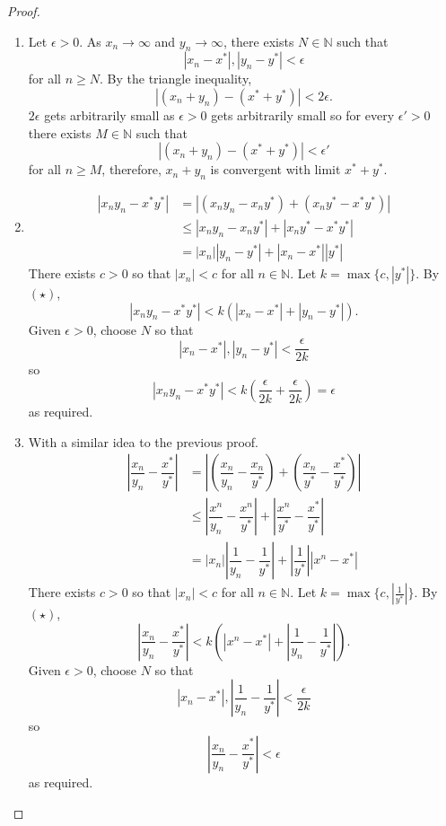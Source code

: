 \begin{proof}
    \begin{enumerate}
        \item Let $\epsilon>0$. As $x_n\to\infty$ and $y_n\to\infty$, there exists $N\in\mathbb N$ such that \[|x_n-x^*|,|y_n-y^*|<\epsilon\] for all $n\geq N$. By the triangle inequality, \[|(x_n+y_n)-(x^*+y^*)|<2\epsilon.\] $2\epsilon$ gets arbitrarily small as $\epsilon>0$ gets arbitrarily small so for every $\epsilon'>0$ there exists $M\in\mathbb N$ such that \[|(x_n+y_n)-(x^*+y^*)|<\epsilon'\] for all $n\geq M$, therefore, $x_n+y_n$ is convergent with limit $x^*+y^*$.
        
        \item 
        \begin{align*}
            |x_ny_n-x^*y^*|&=|(x_ny_n-x_ny^*)+(x_ny^*-x^*y^*)|\\
            &\leq|x_ny_n-x_ny^*|+|x_ny^*-x^*y^*|\\
            &=|x_n||y_n-y^*|+|x_n-x^*||y^*|\tag{$\star$}
        \end{align*}
        There exists $c>0$ so that $|x_n|<c$ for all $n\in\mathbb N$. Let $k=\max\{c,|y^*|\}$. By $(\star)$, \[|x_ny_n-x^*y^*|<k(|x_n-x^*|+|y_n-y^*|).\] Given $\epsilon>0$, choose $N$ so that \[|x_n-x^*|,|y_n-y^*|<\dfrac{\epsilon}{2k}\] so \[|x_ny_n-x^*y^*|<k\left(\dfrac{\epsilon}{2k}+\dfrac{\epsilon}{2k}\right)=\epsilon\] as required.

        \item With a similar idea to the previous proof.
        \begin{align*}
            \left|\dfrac{x_n}{y_n}-\dfrac{x^*}{y^*}\right|&=\left|\left(\dfrac{x_n}{y_n}-\dfrac{x_n}{y^*}\right)+\left(\dfrac{x_n}{y^*}-\dfrac{x^*}{y^*}\right)\right|\\
            &\leq\left|\dfrac{x^n}{y_n}-\dfrac{x^n}{y^*}\right|+\left|\dfrac{x^n}{y^*}-\dfrac{x^*}{y^*}\right|\\
            &=|x_n|\left|\dfrac{1}{y_n}-\dfrac{1}{y^*}\right|+\left|\dfrac1{y^*}\right|\left|x^n-x^*\right|\tag{$\star$}
        \end{align*}
        There exists $c>0$ so that $|x_n|<c$ for all $n\in\mathbb N$. Let $k=\max\{c,|\frac1{y^*}|\}$. By $(\star)$, \[\left|\dfrac{x_n}{y_n}-\dfrac{x^*}{y^*}\right|<k\left(\left|x^n-x^*\right|+\left|\dfrac{1}{y_n}-\dfrac{1}{y^*}\right|\right).\] Given $\epsilon>0$, choose $N$ so that \[|x_n-x^*|,\left|\dfrac1{y_n}-\dfrac1{y^*}\right|<\dfrac{\epsilon}{2k}\] so \[\left|\dfrac{x_n}{y_n}-\dfrac{x^*}{y^*}\right|<\epsilon\] as required.
    \end{enumerate}
\end{proof}

